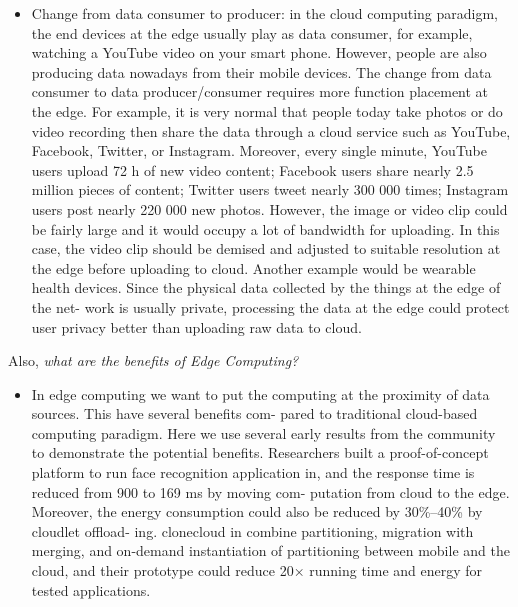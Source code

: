 \begin{itemize}
    \item Change from data consumer to producer: in the cloud computing paradigm, the end devices at the edge usually play as data consumer, for example, watching a YouTube video on your smart phone. However, people are also producing data nowadays from their mobile devices. The change from data consumer to data producer/consumer requires more function placement at the edge. For example, it is very normal that people today take photos or do video recording then share the data through a cloud service such as YouTube, Facebook, Twitter, or Instagram. Moreover, every single minute, YouTube users upload 72 h of new video content; Facebook users share nearly 2.5 million pieces of content; Twitter users tweet nearly 300 000 times; Instagram users post nearly 220 000 new photos. However, the image or video clip could be fairly large and it would occupy a lot of bandwidth for uploading. In this case, the video clip should be demised and adjusted to suitable resolution at the edge before uploading to cloud. Another example would be wearable health devices. Since the physical data collected by the things at the edge of the net- work is usually private, processing the data at the edge could protect user privacy better than uploading raw data to cloud.

\end{itemize}

Also, \textit{what are the benefits of Edge Computing?}
\begin{itemize}
    \item In edge computing we want to put the computing at the proximity of data sources. This have several benefits com- pared to traditional cloud-based computing paradigm. Here we use several early results from the community to demonstrate the potential benefits. Researchers built a proof-of-concept platform to run face recognition application in, and the response time is reduced from 900 to 169 ms by moving com- putation from cloud to the edge. Moreover, the energy consumption could also be reduced by 30\%–40\% by cloudlet offload- ing. clonecloud in combine partitioning, migration with merging, and on-demand instantiation of partitioning between mobile and the cloud, and their prototype could reduce 20× running time and energy for tested applications.
\end{itemize}




